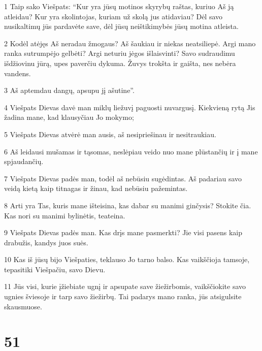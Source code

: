 \par 1 Taip sako Viešpats: “Kur yra jūsų motinos skyrybų raštas, kuriuo Aš ją atleidau? Kur yra skolintojas, kuriam už skolą jus atidaviau? Dėl savo nusikaltimų jūs pardavėte save, dėl jūsų neištikimybės jūsų motina atleista. 
\par 2 Kodėl atėjęs Aš neradau žmogaus? Aš šaukiau ir niekas neatsiliepė. Argi mano ranka sutrumpėjo gelbėti? Argi neturiu jėgos išlaisvinti? Savo sudraudimu išdžiovinu jūrą, upes paverčiu dykuma. Žuvys trokšta ir gaišta, nes nebėra vandens. 
\par 3 Aš aptemdau dangų, apsupu jį ašutine”. 
\par 4 Viešpats Dievas davė man miklų liežuvį paguosti nuvargusį. Kiekvieną rytą Jis žadina mane, kad klausyčiau Jo mokymo; 
\par 5 Viešpats Dievas atvėrė man ausis, aš nesipriešinau ir nesitraukiau. 
\par 6 Aš leidausi mušamas ir tąsomas, neslėpiau veido nuo mane plūstančių ir į mane spjaudančių. 
\par 7 Viešpats Dievas padės man, todėl aš nebūsiu sugėdintas. Aš padariau savo veidą kietą kaip titnagas ir žinau, kad nebūsiu pažemintas. 
\par 8 Arti yra Tas, kuris mane išteisina, kas dabar su manimi ginčysis? Stokite čia. Kas nori su manimi bylinėtis, teateina. 
\par 9 Viešpats Dievas padės man. Kas drįs mane pasmerkti? Jie visi pasens kaip drabužis, kandys juos suės. 
\par 10 Kas iš jūsų bijo Viešpaties, teklauso Jo tarno balso. Kas vaikščioja tamsoje, tepasitiki Viešpačiu, savo Dievu. 
\par 11 Jūs visi, kurie įžiebiate ugnį ir apsupate save žiežirbomis, vaikščiokite savo ugnies šviesoje ir tarp savo žiežirbų. Tai padarys mano ranka, jūs atsigulsite skausmuose.



\chapter{51}


